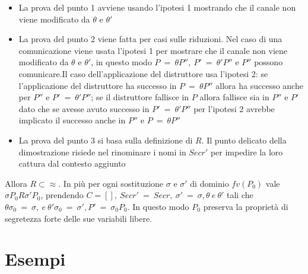 \documentclass[12pt]{report}
\begin{document}
\begin{itemize}
    \item La prova del punto 1 avviene usando l'ipotesi 1 mostrando che il canale non viene modificato da $\theta$ e $\theta'$
    \item La prova del punto 2 viene fatta per casi sulle riduzioni. Nel caso di una comunicazione viene usata l'ipotesi 1 per mostrare che il canale non viene modificato da $\theta$ e $\theta'$, in questo modo $ P\ =\ \theta P'',\ P'\ =\ \theta'P'' $ e $P''$ possono comunicare.Il caso dell'applicazione del distruttore usa l'ipotesi 2: se l'applicazione del distruttore ha successo in $P\ =\ \theta P''$ allora ha successo anche per $P''$ e $P'\ =\ \theta'P''$; se il distruttore fallisce in $P$ allora fallisce sia in $P''$ e $P'$ dato che se avesse avuto successo in $P'\ =\ \theta'P''$ per l'ipotesi 2 avrebbe implicato il successo anche in $P''$ e $P\ =\ \theta P''$
    \item La prova del punto 3 si basa sulla definizione di $R$. Il punto delicato della dimostrazione risiede nel rinominare i nomi in $Secr'$ per impedire la loro cattura dal contesto aggiunto
\end{itemize}
Allora $R \subset \approx$. In più per ogni sostituzione $\sigma$ e $\sigma'$ di dominio $fv(P_0)$ vale $\sigma P_0 R \sigma'P_0$, prendendo $C=[],\ Secr'\ =\ Secr,\ \sigma'\ =\ \sigma, \theta \ e\ \theta'$ tali che $\theta \sigma_0 \ =\ \sigma,\ e\ \theta'\sigma_0\ =\ \sigma', P'\ =\ \sigma_0 P_0$. In questo modo $P_0$ preserva la proprietà di segretezza forte delle sue variabili libere.
\section*{Esempi}
\end{document}
